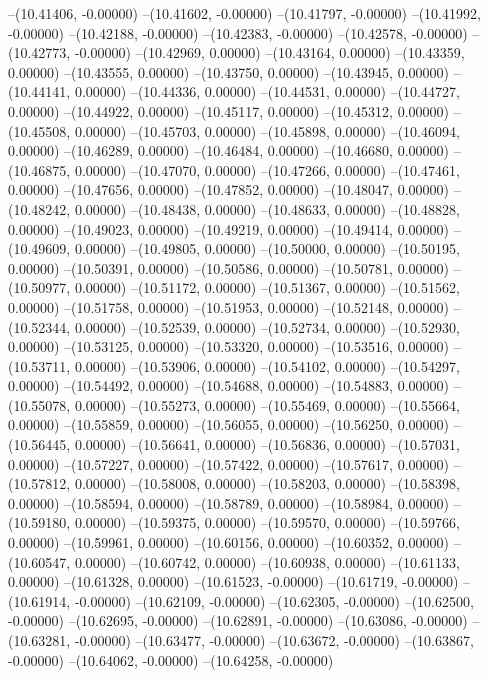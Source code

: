 --(10.41406, -0.00000)
--(10.41602, -0.00000)
--(10.41797, -0.00000)
--(10.41992, -0.00000)
--(10.42188, -0.00000)
--(10.42383, -0.00000)
--(10.42578, -0.00000)
--(10.42773, -0.00000)
--(10.42969, 0.00000)
--(10.43164, 0.00000)
--(10.43359, 0.00000)
--(10.43555, 0.00000)
--(10.43750, 0.00000)
--(10.43945, 0.00000)
--(10.44141, 0.00000)
--(10.44336, 0.00000)
--(10.44531, 0.00000)
--(10.44727, 0.00000)
--(10.44922, 0.00000)
--(10.45117, 0.00000)
--(10.45312, 0.00000)
--(10.45508, 0.00000)
--(10.45703, 0.00000)
--(10.45898, 0.00000)
--(10.46094, 0.00000)
--(10.46289, 0.00000)
--(10.46484, 0.00000)
--(10.46680, 0.00000)
--(10.46875, 0.00000)
--(10.47070, 0.00000)
--(10.47266, 0.00000)
--(10.47461, 0.00000)
--(10.47656, 0.00000)
--(10.47852, 0.00000)
--(10.48047, 0.00000)
--(10.48242, 0.00000)
--(10.48438, 0.00000)
--(10.48633, 0.00000)
--(10.48828, 0.00000)
--(10.49023, 0.00000)
--(10.49219, 0.00000)
--(10.49414, 0.00000)
--(10.49609, 0.00000)
--(10.49805, 0.00000)
--(10.50000, 0.00000)
--(10.50195, 0.00000)
--(10.50391, 0.00000)
--(10.50586, 0.00000)
--(10.50781, 0.00000)
--(10.50977, 0.00000)
--(10.51172, 0.00000)
--(10.51367, 0.00000)
--(10.51562, 0.00000)
--(10.51758, 0.00000)
--(10.51953, 0.00000)
--(10.52148, 0.00000)
--(10.52344, 0.00000)
--(10.52539, 0.00000)
--(10.52734, 0.00000)
--(10.52930, 0.00000)
--(10.53125, 0.00000)
--(10.53320, 0.00000)
--(10.53516, 0.00000)
--(10.53711, 0.00000)
--(10.53906, 0.00000)
--(10.54102, 0.00000)
--(10.54297, 0.00000)
--(10.54492, 0.00000)
--(10.54688, 0.00000)
--(10.54883, 0.00000)
--(10.55078, 0.00000)
--(10.55273, 0.00000)
--(10.55469, 0.00000)
--(10.55664, 0.00000)
--(10.55859, 0.00000)
--(10.56055, 0.00000)
--(10.56250, 0.00000)
--(10.56445, 0.00000)
--(10.56641, 0.00000)
--(10.56836, 0.00000)
--(10.57031, 0.00000)
--(10.57227, 0.00000)
--(10.57422, 0.00000)
--(10.57617, 0.00000)
--(10.57812, 0.00000)
--(10.58008, 0.00000)
--(10.58203, 0.00000)
--(10.58398, 0.00000)
--(10.58594, 0.00000)
--(10.58789, 0.00000)
--(10.58984, 0.00000)
--(10.59180, 0.00000)
--(10.59375, 0.00000)
--(10.59570, 0.00000)
--(10.59766, 0.00000)
--(10.59961, 0.00000)
--(10.60156, 0.00000)
--(10.60352, 0.00000)
--(10.60547, 0.00000)
--(10.60742, 0.00000)
--(10.60938, 0.00000)
--(10.61133, 0.00000)
--(10.61328, 0.00000)
--(10.61523, -0.00000)
--(10.61719, -0.00000)
--(10.61914, -0.00000)
--(10.62109, -0.00000)
--(10.62305, -0.00000)
--(10.62500, -0.00000)
--(10.62695, -0.00000)
--(10.62891, -0.00000)
--(10.63086, -0.00000)
--(10.63281, -0.00000)
--(10.63477, -0.00000)
--(10.63672, -0.00000)
--(10.63867, -0.00000)
--(10.64062, -0.00000)
--(10.64258, -0.00000)
